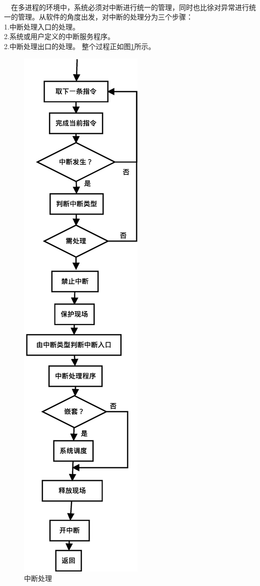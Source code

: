 \documentclass[UTF8,nofonts,cs4size]{ctexrep}
\begin{document}
\paragraph{}
\indent \ \ 在多进程的环境中，系统必须对中断进行统一的管理，同时也比徐对异常进行统一的管理。从软件的角度出发，对中断的处理分为三个步骤：
\\ \indent 1.中断处理入口的处理。
\\ \indent 2.系统或用户定义的中断服务程序。
\\ \indent 2.中断处理出口的处理。
整个过程正如图\ref{interup}所示。

\begin{figure}[htp]
\centering
\includegraphics[scale=0.4]{interup.eps}
\caption{中断处理}
\label{interup}
\end{figure}
\end{document}
